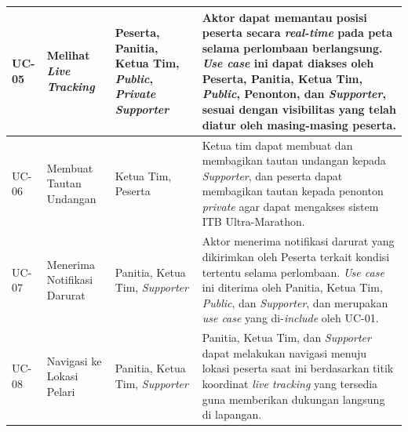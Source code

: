 \begin{longtable}{|p{1cm}|p{3.5cm}|p{3.2cm}|p{5.5cm}|}
UC-05 & Melihat \textit{Live Tracking} & Peserta, Panitia, Ketua Tim, \textit{Public}, \textit{Private} \textit{Supporter} &
Aktor dapat memantau posisi peserta secara \textit{real-time} pada peta
selama perlombaan berlangsung. \textit{Use case} ini dapat diakses oleh
Peserta, Panitia, Ketua Tim, \textit{Public}, Penonton, dan
\textit{Supporter}, sesuai dengan visibilitas yang telah diatur oleh
masing-masing peserta. \\ \hline

UC-06 & Membuat Tautan Undangan & Ketua Tim, Peserta &
Ketua tim dapat membuat dan membagikan tautan undangan kepada \textit{Supporter},
dan peserta dapat membagikan tautan kepada penonton \textit{private} agar dapat
mengakses sistem ITB Ultra-Marathon. \\ \hline

UC-07 & Menerima Notifikasi Darurat & Panitia, Ketua Tim, \textit{Supporter} &
Aktor menerima notifikasi darurat yang dikirimkan oleh Peserta terkait
kondisi tertentu selama perlombaan. \textit{Use case} ini diterima oleh
Panitia, Ketua Tim, \textit{Public}, dan \textit{Supporter}, dan merupakan
\textit{use case} yang di-\textit{include} oleh UC-01. \\ \hline

UC-08 & Navigasi ke Lokasi Pelari & Panitia, Ketua Tim, \textit{Supporter} &
Panitia, Ketua Tim, dan \textit{Supporter} dapat melakukan navigasi menuju
lokasi peserta saat ini berdasarkan titik koordinat \textit{live tracking}
yang tersedia guna memberikan dukungan langsung di lapangan. \\ \hline

\end{longtable}